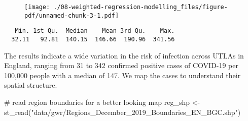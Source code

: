 \documentclass[
  letterpaper,
  krantz2]{style/krantz}
\newenvironment{Shaded}{\begin{snugshade}}{\end{snugshade}}
\newcommand{\AttributeTok}[1]{\textcolor[rgb]{0.40,0.45,0.13}{#1}}
\newcommand{\CommentTok}[1]{\textcolor[rgb]{0.37,0.37,0.37}{#1}}
\newcommand{\DecValTok}[1]{\textcolor[rgb]{0.68,0.00,0.00}{#1}}
\newcommand{\FloatTok}[1]{\textcolor[rgb]{0.68,0.00,0.00}{#1}}
\newcommand{\FunctionTok}[1]{\textcolor[rgb]{0.28,0.35,0.67}{#1}}
\newcommand{\NormalTok}[1]{\textcolor[rgb]{0.00,0.23,0.31}{#1}}
\newcommand{\OtherTok}[1]{\textcolor[rgb]{0.00,0.23,0.31}{#1}}
\newcommand{\SpecialCharTok}[1]{\textcolor[rgb]{0.37,0.37,0.37}{#1}}
\newcommand{\StringTok}[1]{\textcolor[rgb]{0.13,0.47,0.30}{#1}}
\begin{document}
\begin{Shaded}
\end{Shaded}

\begin{figure}[H]

{\centering \texttt{[image: ./08-weighted-regression-modelling\_files/figure-pdf/unnamed-chunk-3-1.pdf]}

}

\end{figure}

\begin{Shaded}
\end{Shaded}

\begin{verbatim}
   Min. 1st Qu.  Median    Mean 3rd Qu.    Max. 
  32.11   92.81  140.15  146.66  190.96  341.56 
\end{verbatim}

The results indicate a wide variation in the risk of infection across
UTLAs in England, ranging from 31 to 342 confirmed positive cases of
COVID-19 per 100,000 people with a median of 147. We map the cases to
understand their spatial structure.

\begin{Shaded}
\begin{Highlighting}[]
\CommentTok{\# read region boundaries for a better looking map}
\NormalTok{reg\_shp }\OtherTok{\textless{}{-}} \FunctionTok{st\_read}\NormalTok{(}\StringTok{"data/gwr/Regions\_December\_2019\_Boundaries\_EN\_BGC.shp"}\NormalTok{)}
\end{Highlighting}
\end{Shaded}
\end{document}
